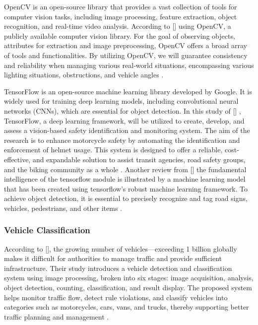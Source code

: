 \begin{refsection}
OpenCV is an open-source library that provides a vast collection of tools for computer vision tasks, including image processing, feature extraction, object recognition, and real-time video analysis. According to \citeauthor{satheesh2024automated} [\citeyear{satheesh2024automated}] using OpenCV, a publicly available computer vision library. For the goal of observing objects, attributes for extraction and image preprocessing, OpenCV offers a broad array of tools and functionalities. By utilizing OpenCV, we will guarantee consistency and reliability when managing various real-world situations, encompassing various lighting situations, obstructions, and vehicle angles \cite{satheesh2024automated}.

TensorFlow is an open-source machine learning library developed by Google. It is widely used for training deep learning models, including convolutional neural networks (CNNs), which are essential for object detection. In this study of \citeauthor{kumar2023vision} [\citeyear{kumar2023vision}] , TensorFlow, a deep learning framework, will be utilized to create, develop, and assess a vision-based safety identification and monitoring system. The aim of the research is to enhance motorcycle safety by automating the identification and enforcement of helmet usage. This system is designed to offer a reliable, cost-effective, and expandable solution to assist transit agencies, road safety groups, and the biking community as a whole \cite{kumar2023vision}. Another review from \citeauthor{sharma2024vision} [\citeyear{sharma2024vision}] the fundamental intelligence of the tensorflow module is illustrated by a machine learning model that has been created using tensorflow's robust machine learning framework. To achieve object detection, it is essential to precisely recognize and tag road signs, vehicles, pedestrians, and other items \cite{sharma2024vision}.  

\subsubsection{Vehicle Classification}
    According to \citeauthor{chandrika2020vehicle} [\citeyear{chandrika2020vehicle}], the growing number of vehicles—exceeding 1 billion globally makes it difficult for authorities to manage traffic and provide sufficient infrastructure. Their study introduces a vehicle detection and classification system using image processing, broken into six stages: image acquisition, analysis, object detection, counting, classification, and result display. The proposed system helps monitor traffic flow, detect rule violations, and classify vehicles into categories such as motorcycles, cars, vans, and trucks, thereby supporting better traffic planning and management \cite{chandrika2020vehicle}.


\end{refsection}
